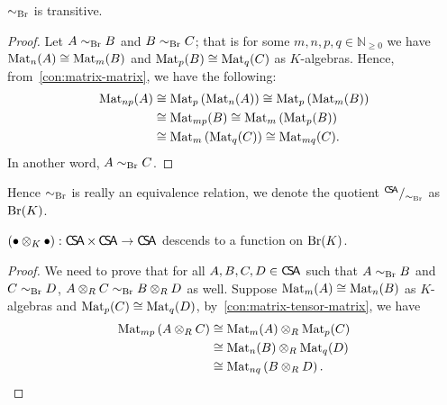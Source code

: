 \begin{lemma}
  $\sim_{\operatorname{Br}}$ is transitive.
  \leanok
\end{lemma}
\begin{proof}
  Let $A\sim_{\operatorname{Br}}B$ and $B\sim_{\operatorname{Br}}C$; that is for some $m,n,p, q\in\mathbb{N}_{\ge0}$ we have $\operatorname{Mat}_{n}(A)\cong\operatorname{Mat}_{m}(B)$ and $\operatorname{Mat}_{p}(B)\cong \operatorname{Mat}_{q}(C)$ as $K$-algebras. Hence, from~\cref{con:matrix-matrix}, we have the following:
  \[
    \begin{aligned}
      \operatorname{Mat}_{np}(A)&\cong \operatorname{Mat}_{p}\left(\operatorname{Mat}_{n}(A)\right)\cong\operatorname{Mat}_{p}\left(\operatorname{Mat}_{m}(B)\right)\\
                  &\cong\operatorname{Mat}_{mp}(B)\cong\operatorname{Mat}_{m}\left(\operatorname{Mat}_{p}(B)\right)\\
      &\cong\operatorname{Mat}_{m}\left(\operatorname{Mat}_{q}(C)\right)\cong\operatorname{Mat}_{mq}(C).
    \end{aligned}
  \]
  In another word, $A\sim_{\operatorname{Br}}C$.
\end{proof}

Hence $\sim_{\operatorname{Br}}$ is really an equivalence relation, we denote the quotient ${}^{\operatorname{\mathsf{C}\!\mathsf{S}\!\mathsf{A}}}/_{\sim_{\operatorname{Br}}}$ as $\operatorname{Br}(K)$.

\begin{lemma}\label{lem:br-mul-wd}
  $(\bullet\otimes_{K}\bullet):\operatorname{\mathsf{C}\!\mathsf{S}\!\mathsf{A}}\times\operatorname{\mathsf{C}\!\mathsf{S}\!\mathsf{A}} \to \operatorname{\mathsf{C}\!\mathsf{S}\!\mathsf{A}}$ descends to a function on $\operatorname{Br}(K)$.
  \leanok
\end{lemma}
\begin{proof}
  We need to prove that for all $A, B, C, D \in \operatorname{\mathsf{C}\!\mathsf{S}\!\mathsf{A}}$ such that $A\sim_{\operatorname{Br}} B$ and $C\sim_{\operatorname{Br}}D$, $A\otimes_{R}C \sim_{\operatorname{Br}} B\otimes_{R}D$ as well.
  Suppose $\operatorname{Mat}_{m}(A)\cong \operatorname{Mat}_{n}(B)$ as $K$-algebras and $\operatorname{Mat}_{p}(C)\cong\operatorname{Mat}_{q}(D)$, by~\cref{con:matrix-tensor-matrix}, we have
  \[
    \begin{aligned}
      \operatorname{Mat}_{mp}\left(A\otimes_{R} C\right)&\cong \operatorname{Mat}_{m}(A)\otimes_{R}\operatorname{Mat}_{p}(C) \\
                                          &\cong \operatorname{Mat}_{n}(B)\otimes_{R}\operatorname{Mat}_{q}(D)\\
      &\cong \operatorname{Mat}_{nq}\left(B\otimes_{R}D\right).
    \end{aligned}
  \]

\end{proof}

